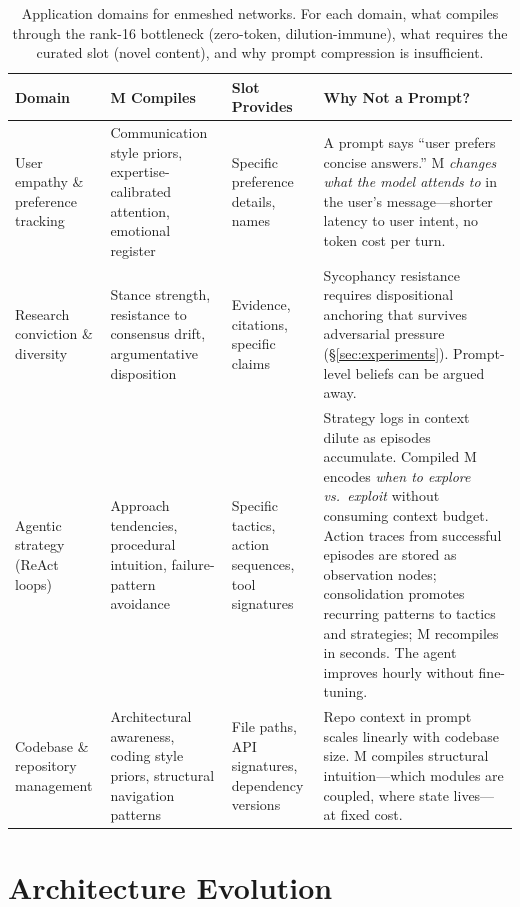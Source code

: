 \begin{table}[!ht]
\centering
\small
\caption{Application domains for enmeshed networks. For each domain, what compiles through the rank-16 bottleneck (zero-token, dilution-immune), what requires the curated slot (novel content), and why prompt compression is insufficient.}
\label{tab:application_domains}
\begin{tabular}{p{2.0cm}p{2.5cm}p{2.0cm}p{4.5cm}}
\toprule
\textbf{Domain} & \textbf{M Compiles} & \textbf{Slot Provides} & \textbf{Why Not a Prompt?} \\
\midrule
User empathy \& preference tracking & Communication style priors, expertise-calibrated attention, emotional register & Specific preference details, names & A prompt says ``user prefers concise answers.'' M \emph{changes what the model attends to} in the user's message---shorter latency to user intent, no token cost per turn. \\
\addlinespace
Research conviction \& diversity & Stance strength, resistance to consensus drift, argumentative disposition & Evidence, citations, specific claims & Sycophancy resistance requires dispositional anchoring that survives adversarial pressure (\S\ref{sec:experiments}). Prompt-level beliefs can be argued away. \\
\addlinespace
Agentic strategy (ReAct loops) & Approach tendencies, procedural intuition, failure-pattern avoidance & Specific tactics, action sequences, tool signatures & Strategy logs in context dilute as episodes accumulate. Compiled M encodes \emph{when to explore vs.\ exploit} without consuming context budget. Action traces from successful episodes are stored as observation nodes; consolidation promotes recurring patterns to tactics and strategies; M recompiles in seconds. The agent improves hourly without fine-tuning. \\
\addlinespace
Codebase \& repository management & Architectural awareness, coding style priors, structural navigation patterns & File paths, API signatures, dependency versions & Repo context in prompt scales linearly with codebase size. M compiles structural intuition---which modules are coupled, where state lives---at fixed cost. \\
\bottomrule
\end{tabular}
\end{table}

\section{Architecture Evolution}
\label{sec:design_progression}


